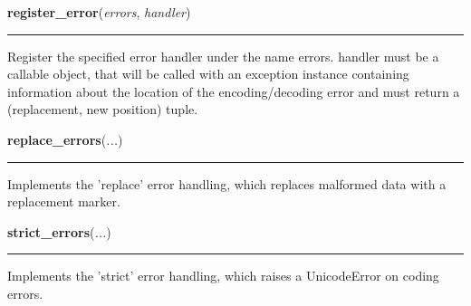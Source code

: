     \label{codecs:register_error}

    \vspace{0.5ex}

\hspace{.8\funcindent}\begin{boxedminipage}{\funcwidth}

    \raggedright \textbf{register\_error}(\textit{errors}, \textit{handler})

    \vspace{-1.5ex}

    \rule{\textwidth}{0.5\fboxrule}
\setlength{\parskip}{2ex}
    Register the specified error handler under the name errors. handler 
    must be a callable object, that will be called with an exception 
    instance containing information about the location of the 
    encoding/decoding error and must return a (replacement, new position) 
    tuple.

\setlength{\parskip}{1ex}
    \end{boxedminipage}

    \label{codecs:replace_errors}

    \vspace{0.5ex}

\hspace{.8\funcindent}\begin{boxedminipage}{\funcwidth}

    \raggedright \textbf{replace\_errors}(\textit{...})

    \vspace{-1.5ex}

    \rule{\textwidth}{0.5\fboxrule}
\setlength{\parskip}{2ex}
    Implements the 'replace' error handling, which replaces malformed data 
    with a replacement marker.

\setlength{\parskip}{1ex}
    \end{boxedminipage}

    \label{codecs:strict_errors}

    \vspace{0.5ex}

\hspace{.8\funcindent}\begin{boxedminipage}{\funcwidth}

    \raggedright \textbf{strict\_errors}(\textit{...})

    \vspace{-1.5ex}

    \rule{\textwidth}{0.5\fboxrule}
\setlength{\parskip}{2ex}
    Implements the 'strict' error handling, which raises a UnicodeError on 
    coding errors.

\setlength{\parskip}{1ex}
    \end{boxedminipage}

